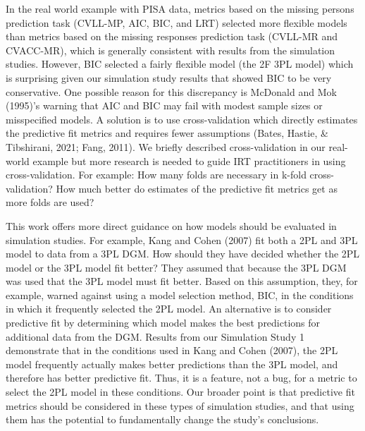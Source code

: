 \documentclass[
  english,
  man,floatsintext]{apa7}
\begin{document}
In the real world example with PISA data, metrics based on the missing persons prediction task (CVLL-MP, AIC, BIC, and LRT) selected more flexible models than metrics based on the missing responses prediction task (CVLL-MR and CVACC-MR), which is generally consistent with results from the simulation studies. However, BIC selected a fairly flexible model (the 2F 3PL model) which is surprising given our simulation study results that showed BIC to be very conservative. One possible reason for this discrepancy is McDonald and Mok (1995)'s warning that AIC and BIC may fail with modest sample sizes or misspecified models. A solution is to use cross-validation which directly estimates the predictive fit metrics and requires fewer assumptions (Bates, Hastie, \& Tibshirani, 2021; Fang, 2011). We briefly described cross-validation in our real-world example but more research is needed to guide IRT practitioners in using cross-validation. For example: How many folds are necessary in k-fold cross-validation? How much better do estimates of the predictive fit metrics get as more folds are used?

This work offers more direct guidance on how models should be evaluated in simulation studies. For example, Kang and Cohen (2007) fit both a 2PL and 3PL model to data from a 3PL DGM. How should they have decided whether the 2PL model or the 3PL model fit better? They assumed that because the 3PL DGM was used that the 3PL model must fit better. Based on this assumption, they, for example, warned against using a model selection method, BIC, in the conditions in which it frequently selected the 2PL model. An alternative is to consider predictive fit by determining which model makes the best predictions for additional data from the DGM. Results from our Simulation Study 1 demonstrate that in the conditions used in Kang and Cohen (2007), the 2PL model frequently actually makes better predictions than the 3PL model, and therefore has better predictive fit. Thus, it is a feature, not a bug, for a metric to select the 2PL model in these conditions. Our broader point is that predictive fit metrics should be considered in these types of simulation studies, and that using them has the potential to fundamentally change the study's conclusions.
\end{document}
